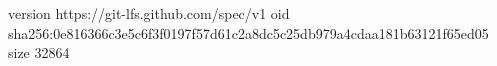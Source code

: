 version https://git-lfs.github.com/spec/v1
oid sha256:0e816366c3e5c6f3f0197f57d61c2a8dc5c25db979a4cdaa181b63121f65ed05
size 32864
